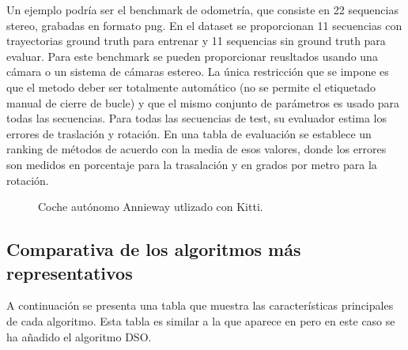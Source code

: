 \begin {enumerate}
Un ejemplo podría ser el benchmark de odometría, que consiste en 22 sequencias stereo, grabadas en formato png. En el dataset se proporcionan 11 secuencias con trayectorias ground truth para entrenar y 11 sequencias sin ground truth para evaluar. Para este benchmark se pueden proporcionar reusltados usando una cámara o un sistema de cámaras estereo.
La única restricción que se impone es que el metodo deber ser totalmente automático (no se permite el etiquetado manual de cierre de bucle) y que el mismo conjunto de parámetros es usado para todas las secuencias.
Para todas las secuencias de test, su evaluador estima los errores de traslación y rotación. En una tabla de evaluación se establece un ranking de métodos de acuerdo con la media de esos valores, donde los errores son medidos en porcentaje para la trasalación y en grados por metro para la rotación.
\begin{figure}[H]
\begin{center}
\end{center}
\caption{Coche autónomo Annieway utlizado con Kitti.}
\end{figure}

\end {enumerate}


\subsection{Comparativa de los algoritmos más representativos} 
A continuación se presenta una tabla que muestra las características principales de cada algoritmo. Esta tabla es similar a la que aparece en \cite{Perdices17} pero en este caso se ha añadido el algoritmo DSO.

